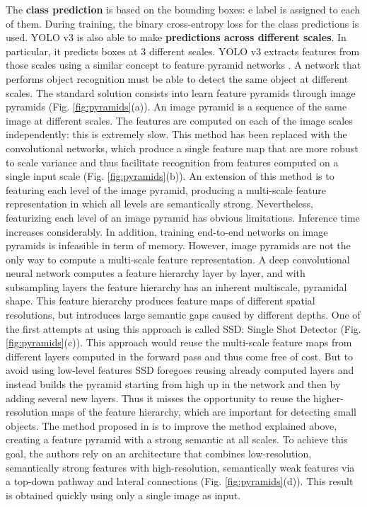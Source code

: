 The \textbf{class prediction} is based on the bounding boxes: e label is assigned to each of them. During training, the binary cross-entropy loss for the class
predictions is used. YOLO v3 is also able to make \textbf{predictions across different scales}. In particular, it predicts boxes at 3 different scales. YOLO v3 extracts features from those scales using a similar concept to feature pyramid networks \cite{DBLP:journals/corr/LinDGHHB16}. A network that performs object recognition must be able to detect the same object at different scales. The standard solution consists into learn feature pyramids through image pyramids (Fig. \ref{fig:pyramids}(a)). An image pyramid is a sequence of the same image at different scales. The features are computed on each of the image scales independently: this is extremely slow. This method has been replaced with the convolutional networks, which produce a single feature map that are more robust to scale variance and thus facilitate recognition from features computed on a single input scale (Fig. \ref{fig:pyramids}(b)). An extension of this method is to featuring each level of the image pyramid, producing a multi-scale feature representation in which all levels are semantically strong. Nevertheless, featurizing each level of an image pyramid has obvious limitations. Inference time increases considerably. In addition, training end-to-end networks on image pyramids is infeasible in term of memory.
However, image pyramids are not the only way to compute a multi-scale feature representation. A deep convolutional neural network computes a feature hierarchy layer by layer, and with subsampling layers the feature hierarchy has an inherent multiscale, pyramidal shape. This feature hierarchy
produces feature maps of different spatial resolutions, but
introduces large semantic gaps caused by different depths. One of the first attempts at using this approach is called SSD: Single Shot Detector (Fig. \ref{fig:pyramids}(c)).
This approach would reuse the multi-scale feature
maps from different layers computed in the forward pass
and thus come free of cost. But to avoid using low-level
features SSD foregoes reusing already computed layers and
instead builds the pyramid starting from high up in the network and then by adding
several new layers. Thus it misses the opportunity to reuse
the higher-resolution maps of the feature hierarchy, which are important for detecting small objects.
The method proposed in \cite{DBLP:journals/corr/LinDGHHB16} is to improve the method explained above, creating a feature pyramid with a strong semantic at all scales. To achieve this goal, the authors rely on an architecture that
combines low-resolution, semantically strong features with
high-resolution, semantically weak features via a top-down
pathway and lateral connections (Fig. \ref{fig:pyramids}(d)). This result is obtained quickly using only a single image as input.

